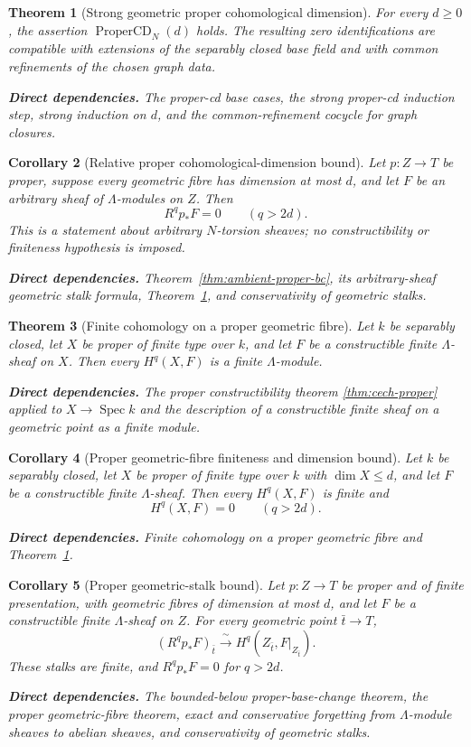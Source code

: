 \documentclass[10pt]{article}
\newtheorem{theorem}{Theorem}[section]
\newtheorem{corollary}[theorem]{Corollary}
\theoremstyle{definition}
\newcommand{\Spec}{\operatorname{Spec}}
\newcommand{\deps}[1]{\par\smallskip\noindent\textbf{Direct dependencies.} #1}
\begin{document}
\begin{theorem}[Strong geometric proper cohomological dimension]
\label{thm:proper-cd}
For every $d\geq0$, the assertion $\operatorname{ProperCD}_N(d)$ holds.
The resulting zero identifications are compatible with extensions of the
separably closed base field and with common refinements of the chosen graph
data.
\deps{The proper-cd base cases, the strong proper-cd induction step, strong
induction on $d$, and the common-refinement cocycle for graph closures.}
\end{theorem}

\begin{corollary}[Relative proper cohomological-dimension bound]
\label{cor:relative-proper-cd}
Let $p:Z\to T$ be proper, suppose every geometric fibre has dimension at
most $d$, and let $F$ be an arbitrary sheaf of $\Lambda$-modules on $Z$.
Then
\[
 R^qp_*F=0\qquad(q>2d).
\]
This is a statement about arbitrary $N$-torsion sheaves; no constructibility
or finiteness hypothesis is imposed.
\deps{Theorem~\ref{thm:ambient-proper-bc}, its arbitrary-sheaf geometric
stalk formula, Theorem~\ref{thm:proper-cd}, and conservativity of geometric
stalks.}
\end{corollary}

\begin{theorem}[Finite cohomology on a proper geometric fibre]
\label{thm:proper-fibre-finite}
Let $k$ be separably closed, let $X$ be proper of finite type over $k$, and
let $F$ be a constructible finite $\Lambda$-sheaf on $X$.  Then every
$H^q(X,F)$ is a finite $\Lambda$-module.
\deps{The proper constructibility theorem
\ref{thm:cech-proper} applied to $X\to\Spec k$ and the description of a
constructible finite sheaf on a geometric point as a finite module.}
\end{theorem}

\begin{corollary}[Proper geometric-fibre finiteness and dimension bound]
\label{thm:fibre-artin-bound}
Let $k$ be separably closed, let $X$ be proper of finite type over $k$ with
$\dim X\leq d$, and let $F$ be a constructible finite $\Lambda$-sheaf.  Then
every $H^q(X,F)$ is finite and
\[
 H^q(X,F)=0\qquad(q>2d).
\]
\deps{Finite cohomology on a proper geometric fibre and
Theorem~\ref{thm:proper-cd}.}
\end{corollary}

\begin{corollary}[Proper geometric-stalk bound]
\label{cor:proper-stalk-bound}
Let $p:Z\to T$ be proper and of finite presentation, with geometric fibres
of dimension at most $d$, and let $F$ be a constructible finite
$\Lambda$-sheaf on $Z$.  For every geometric point $\bar t\to T$,
\[
 (R^qp_*F)_{\bar t}\xrightarrow{\ \sim\ }
 H^q(Z_{\bar t},F|_{Z_{\bar t}}).
\]
These stalks are finite, and $R^qp_*F=0$ for $q>2d$.
\deps{The bounded-below proper-base-change theorem, the proper
geometric-fibre theorem, exact and conservative forgetting from
$\Lambda$-module sheaves to abelian sheaves, and conservativity of geometric
stalks.}
\end{corollary}
\end{document}
